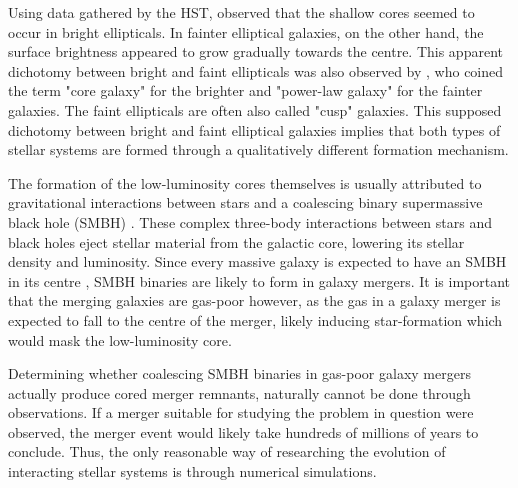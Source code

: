 \documentclass[english, twoside]{HYgradu}
\begin{document}
Using data gathered by the HST, \cite{Ferrarese1994} observed that the shallow cores seemed to occur in bright ellipticals. In fainter elliptical galaxies, on the other hand, the surface brightness appeared to grow gradually towards the centre. This apparent dichotomy between bright and faint ellipticals was also observed by \cite{Lauer1995}, who coined the term "core galaxy" for the brighter and "power-law galaxy" for the fainter galaxies. The faint ellipticals are often also called "cusp" galaxies. This supposed dichotomy between bright and faint elliptical galaxies implies that both types of stellar systems are formed through a qualitatively different formation mechanism. 


The formation of the low-luminosity cores themselves is usually attributed to gravitational interactions between stars and a coalescing binary supermassive black hole (SMBH) \citep{Begelman1980, Faber1997, GalaxyFormationAndEvo2010}. These complex three-body interactions between stars and black holes eject stellar material from the galactic core, lowering its stellar density and luminosity. Since every massive galaxy is expected to have an SMBH in its centre \citep{Kormendy2013}, SMBH binaries are likely to form in galaxy mergers. It is important that the merging galaxies are gas-poor however, as the gas in a galaxy merger is expected to fall to the centre of the merger, likely inducing star-formation which would mask the low-luminosity core.

Determining whether coalescing SMBH binaries in gas-poor galaxy mergers actually produce cored merger remnants, naturally cannot be done through observations. If a merger suitable for studying the problem in question were observed, the merger event would likely take hundreds of millions of years to conclude. Thus, the only reasonable way of researching the evolution of interacting stellar systems is through numerical simulations.


\end{document}
